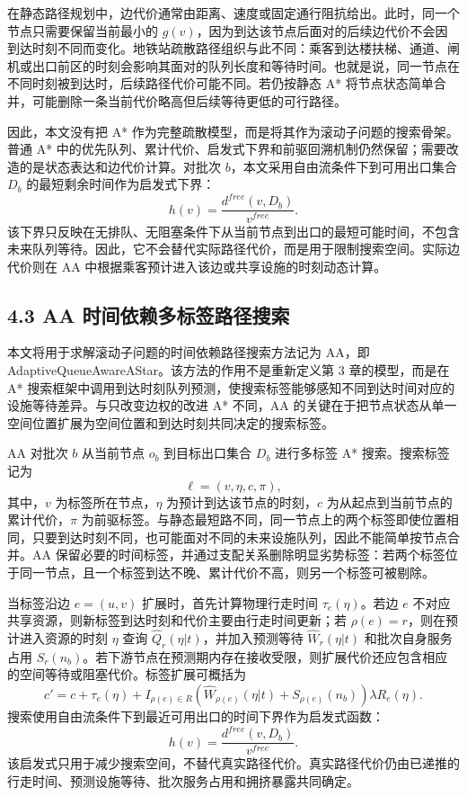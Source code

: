 \documentclass[UTF8,a4paper,12pt]{ctexart}
\begin{document}
在静态路径规划中，边代价通常由距离、速度或固定通行阻抗给出。此时，同一个节点只需要保留当前最小的 \(g(v)\)，因为到达该节点后面对的后续边代价不会因到达时刻不同而变化。地铁站疏散路径组织与此不同：乘客到达楼扶梯、通道、闸机或出口前区的时刻会影响其面对的队列长度和等待时间。也就是说，同一节点在不同时刻被到达时，后续路径代价可能不同。若仍按静态 A* 将节点状态简单合并，可能删除一条当前代价略高但后续等待更低的可行路径。

因此，本文没有把 A* 作为完整疏散模型，而是将其作为滚动子问题的搜索骨架。普通 A* 中的优先队列、累计代价、启发式下界和前驱回溯机制仍然保留；需要改造的是状态表达和边代价计算。对批次 \(b\)，本文采用自由流条件下到可用出口集合 \(D_b\) 的最短剩余时间作为启发式下界：
\[
h(v)=\frac{d^{free}(v,D_b)}{v^{free}}.
\]
该下界只反映在无排队、无阻塞条件下从当前节点到出口的最短可能时间，不包含未来队列等待。因此，它不会替代实际路径代价，而是用于限制搜索空间。实际边代价则在 AA 中根据乘客预计进入该边或共享设施的时刻动态计算。

\subsection{4.3 AA 时间依赖多标签路径搜索}

本文将用于求解滚动子问题的时间依赖路径搜索方法记为 AA，即 AdaptiveQueueAwareAStar。该方法的作用不是重新定义第 3 章的模型，而是在 A* 搜索框架中调用到达时刻队列预测，使搜索标签能够感知不同到达时间对应的设施等待差异。与只改变边权的改进 A* 不同，AA 的关键在于把节点状态从单一空间位置扩展为空间位置和到达时刻共同决定的搜索标签。

AA 对批次 \(b\) 从当前节点 \(o_b\) 到目标出口集合 \(D_b\) 进行多标签 A* 搜索。搜索标签记为
\[
\ell=(v,\eta,c,\pi),
\]
其中，\(v\) 为标签所在节点，\(\eta\) 为预计到达该节点的时刻，\(c\) 为从起点到当前节点的累计代价，\(\pi\) 为前驱标签。与静态最短路不同，同一节点上的两个标签即使位置相同，只要到达时刻不同，也可能面对不同的未来设施队列，因此不能简单按节点合并。AA 保留必要的时间标签，并通过支配关系删除明显劣势标签：若两个标签位于同一节点，且一个标签到达不晚、累计代价不高，则另一个标签可被剔除。

当标签沿边 \(e=(u,v)\) 扩展时，首先计算物理行走时间 \(\tau_e(\eta)\)。若边 \(e\) 不对应共享资源，则新标签到达时刻和代价主要由行走时间更新；若 \(\rho(e)=r\)，则在预计进入资源的时刻 \(\eta\) 查询 \(\widehat Q_r(\eta|t)\)，并加入预测等待 \(\widehat W_r(\eta|t)\) 和批次自身服务占用 \(S_r(n_b)\)。若下游节点在预测期内存在接收受限，则扩展代价还应包含相应的空间等待或阻塞代价。标签扩展可概括为
\[
c'=
c+\tau_e(\eta)+I_{\rho(e)\in R}
\left(\widehat W_{\rho(e)}(\eta|t)+S_{\rho(e)}(n_b)\right)
\lambda R_e(\eta).
\]
搜索使用自由流条件下到最近可用出口的时间下界作为启发式函数：
\[
h(v)=\frac{d^{free}(v,D_b)}{v^{free}}.
\]
该启发式只用于减少搜索空间，不替代真实路径代价。真实路径代价仍由已递推的行走时间、预测设施等待、批次服务占用和拥挤暴露共同确定。
\end{document}
